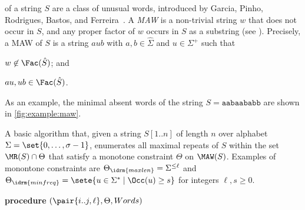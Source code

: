 of a string $S$ are a class of unusual words, introduced by Garcia, Pinho, Rodrigues, Bastos, and Ferreira~\cite{garcia2011minimal}. A \textit{MAW} is a non-trivial string $w$ that does not occur in $S$, and any proper factor of $w$ occurs in $S$ as a substring (see \cite{garcia2011minimal}).
Precisely, a MAW of $S$ is a string $a u b$ with $a, b\in \hat\Sigma$ and $u \in \Sigma^+$ such that
\begin{enumerate*}[(i)]
\item $w \not\in \Fac(\hat S)$; and 
\item $au, ub \in \Fac(\hat S)$. 
\end{enumerate*}

As an example, the minimal absent words of the string $S = \texttt{aabaababb}$ are shown in \cref{fig:example:maw}. 


\begin{algorithm}[t]
  \caption{A basic algorithm that, given a string $S[1..n]$ of length $n$ over alphabet $\Sigma = \set{0, \dots, \sigma-1}$, enumerates all maximal repeats of $S$ within the set $\MR(S)\cap \Theta$ that satisfy a monotone constraint $\Theta$ on $\MAW(S)$. Examples of monontone constraints are
    $\Theta_\idrm{maxlen} = \Sigma^{\le \ell}$ and 
    $\Theta_\idrm{minfreq} = \sete{ u \in \Sigma^*\mid \Occ(u) \ge s }$ for integers $\ell, s\ge 0$.
}\label{fig:example:maw:main}
\textbf{procedure} \MREnum$(\pair{i..j, \ell}, \Theta, Words)$\;
\end{algorithm}

